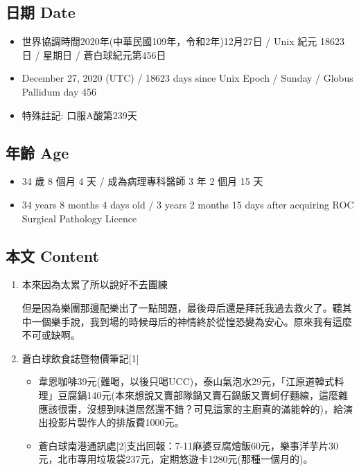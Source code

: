 \documentclass[a5paper, 10pt
]{book}
\providecommand{\tightlist}{%
  \setlength{\itemsep}{0pt}\setlength{\parskip}{0pt}}
\begin{document}
\hypertarget{ux65e5ux671f-date-26}{%
\subsection{日期 Date}\label{ux65e5ux671f-date-26}}

\begin{itemize}
\tightlist
\item
  世界協調時間2020年(中華民國109年，令和2年)12月27日 / Unix 紀元 18623
  日 / 星期日 / 蒼白球紀元第456日
\item
  December 27, 2020 (UTC) / 18623 days since Unix Epoch / Sunday /
  Globus Pallidum day 456
\item
  特殊註記: 口服A酸第239天
\end{itemize}

\hypertarget{ux5e74ux9f61-age-26}{%
\subsection{年齡 Age}\label{ux5e74ux9f61-age-26}}

\begin{itemize}
\tightlist
\item
  34 歲 8 個月 4 天 / 成為病理專科醫師 3 年 2 個月 15 天
\item
  34 years 8 months 4 days old / 3 years 2 months 15 days after
  acquiring ROC Surgical Pathology Licence
\end{itemize}

\hypertarget{ux672cux6587-content-26}{%
\subsection{本文 Content}\label{ux672cux6587-content-26}}

\begin{enumerate}
\def\labelenumi{\arabic{enumi}.}
\item
  本來因為太累了所以說好不去團練

  但是因為樂團那邊配樂出了一點問題，最後母后還是拜託我過去救火了。聽其中一個樂手說，我到場的時候母后的神情終於從惶恐變為安心。原來我有這麼不可或缺啊。
\item
  蒼白球飲食誌暨物價筆記{[}1{]}

  \begin{itemize}
  \tightlist
  \item
    韋恩咖啡39元(難喝，以後只喝UCC)，泰山氣泡水29元，「江原道韓式料理」豆腐鍋140元(本來想說又賣部隊鍋又賣石鍋飯又賣蚵仔麵線，這麼雜應該很雷，沒想到味道居然還不錯？可見這家的主廚真的滿能幹的)，給演出投影片製作人的排版費1000元。
  \item
    蒼白球南港通訊處{[}2{]}支出回報：7-11麻婆豆腐燴飯60元，樂事洋芋片30元，北市專用垃圾袋237元，定期悠遊卡1280元(那種一個月的)。
  \end{itemize}
\end{enumerate}
\end{document}

